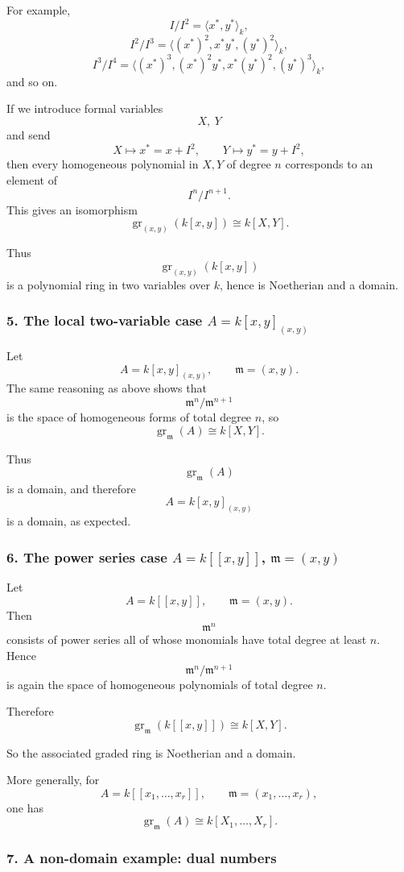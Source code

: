 \documentclass[12pt,a4paper]{article}
\theoremstyle{notespace}
\theoremstyle{definition}
\begin{document}
For example,
\[
I/I^2
=
\langle x^*,y^*\rangle_k,
\]
\[
I^2/I^3
=
\langle (x^*)^2,x^*y^*,(y^*)^2\rangle_k,
\]
\[
I^3/I^4
=
\langle (x^*)^3,(x^*)^2y^*,x^*(y^*)^2,(y^*)^3\rangle_k,
\]
and so on.

If we introduce formal variables
\[
X,\ Y
\]
and send
\[
X\longmapsto x^*=x+I^2,
\qquad
Y\longmapsto y^*=y+I^2,
\]
then every homogeneous polynomial in \(X,Y\) of degree \(n\) corresponds to an element of
\[
I^n/I^{n+1}.
\]
This gives an isomorphism
\[
\operatorname{gr}_{(x,y)}(k[x,y])\cong k[X,Y].
\]

Thus
\[
\operatorname{gr}_{(x,y)}(k[x,y])
\]
is a polynomial ring in two variables over \(k\), hence is Noetherian and a domain.

\subsubsection{5. The local two-variable case \(A=k[x,y]_{(x,y)}\)}

Let
\[
A=k[x,y]_{(x,y)},
\qquad
\mathfrak m=(x,y).
\]
The same reasoning as above shows that
\[
\mathfrak m^n/\mathfrak m^{n+1}
\]
is the space of homogeneous forms of total degree \(n\), so
\[
\operatorname{gr}_{\mathfrak m}(A)\cong k[X,Y].
\]

Thus
\[
\operatorname{gr}_{\mathfrak m}(A)
\]
is a domain, and therefore
\[
A=k[x,y]_{(x,y)}
\]
is a domain, as expected.

\subsubsection{6. The power series case \(A=k[[x,y]]\), \(\mathfrak m=(x,y)\)}

Let
\[
A=k[[x,y]],
\qquad
\mathfrak m=(x,y).
\]
Then
\[
\mathfrak m^n
\]
consists of power series all of whose monomials have total degree at least \(n\). Hence
\[
\mathfrak m^n/\mathfrak m^{n+1}
\]
is again the space of homogeneous polynomials of total degree \(n\).

Therefore
\[
\operatorname{gr}_{\mathfrak m}(k[[x,y]])\cong k[X,Y].
\]

So the associated graded ring is Noetherian and a domain.

More generally, for
\[
A=k[[x_1,\dots,x_r]],
\qquad
\mathfrak m=(x_1,\dots,x_r),
\]
one has
\[
\operatorname{gr}_{\mathfrak m}(A)\cong k[X_1,\dots,X_r].
\]

\subsubsection{7. A non-domain example: dual numbers}
\end{document}
